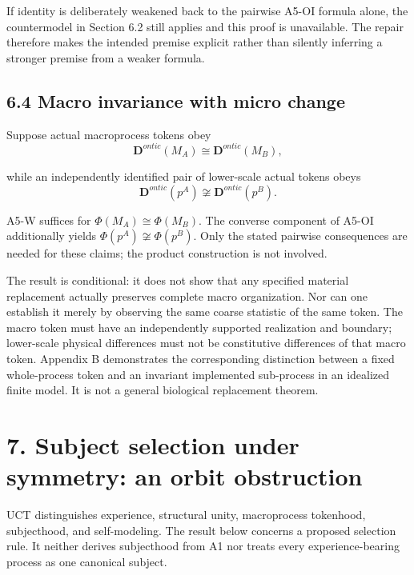 \documentclass[
  11pt,
  a4paper,
]{article}
\begin{document}
If identity is deliberately weakened back to the pairwise A5-OI formula
alone, the countermodel in Section 6.2 still applies and this proof is
unavailable. The repair therefore makes the intended premise explicit
rather than silently inferring a stronger premise from a weaker formula.

\hypertarget{macro-invariance-with-micro-change}{%
\subsection{6.4 Macro invariance with micro
change}\label{macro-invariance-with-micro-change}}

Suppose actual macroprocess tokens obey
\nopagebreak[4]
\[
\mathbf D^{ontic}(M_A)\cong\mathbf D^{ontic}(M_B),
\]

while an independently identified pair of lower-scale actual tokens
obeys
\nopagebreak[4]
\[
\mathbf D^{ontic}(p^A)\not\cong\mathbf D^{ontic}(p^B).
\]

A5-W suffices for \(\Phi(M_A)\cong\Phi(M_B)\). The converse component of
A5-OI additionally yields \(\Phi(p^A)\not\cong\Phi(p^B)\). Only the
stated pairwise consequences are needed for these claims; the product
construction is not involved.

The result is conditional: it does not show that any specified material
replacement actually preserves complete macro organization. Nor can one
establish it merely by observing the same coarse statistic of the same
token. The macro token must have an independently supported realization
and boundary; lower-scale physical differences must not be constitutive
differences of that macro token. Appendix B demonstrates the
corresponding distinction between a fixed whole-process token and an
invariant implemented sub-process in an idealized finite model. It is
not a general biological replacement theorem.

\hypertarget{subject-selection-under-symmetry-an-orbit-obstruction}{%
\section{7. Subject selection under symmetry: an orbit
obstruction}\label{subject-selection-under-symmetry-an-orbit-obstruction}}

UCT distinguishes experience, structural unity, macroprocess tokenhood,
subjecthood, and self-modeling. The result below concerns a proposed
selection rule. It neither derives subjecthood from A1 nor treats every
experience-bearing process as one canonical subject.
\end{document}
